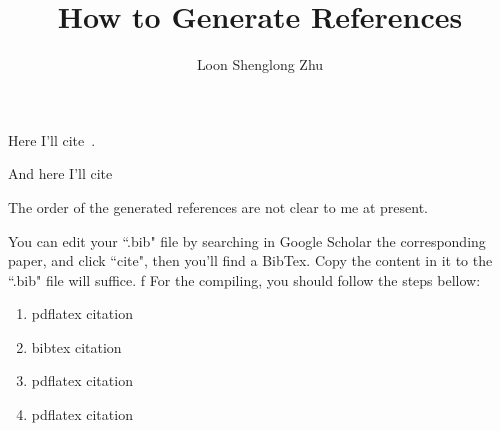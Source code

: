 \documentclass{article}
\title{How to Generate References}
\author{Loon Shenglong Zhu}
\begin{document}
\maketitle


Here I'll cite~\cite{fortune1987sweepline}. 

And here I'll cite~\cite{shamos1975closest, de2000computational, chew1989guaranteed}

The order of the generated references are not clear to me at present.


You can edit your ``.bib" file by searching in Google Scholar the corresponding paper, and click ``cite", then you'll find a BibTex. Copy the content in it to the ``.bib" file will suffice.
f
For the compiling, you should follow the steps bellow:
\begin{enumerate}
\item pdflatex citation
\item bibtex citation
\item pdflatex citation
\item pdflatex citation
\end{enumerate}

\end{document}

